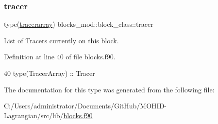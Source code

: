 \subsubsection{\texorpdfstring{tracer}{tracer}}
{\footnotesize\ttfamily type(\mbox{\hyperlink{structtracer__array__mod_1_1tracerarray}{tracerarray}}) blocks\+\_\+mod\+::block\+\_\+class\+::tracer\hspace{0.3cm}{\ttfamily [private]}}



List of Tracers currently on this block. 



Definition at line 40 of file blocks.\+f90.


\begin{DoxyCode}
40         \textcolor{keywordtype}{type}(TracerArray) :: Tracer
\end{DoxyCode}


The documentation for this type was generated from the following file\+:\begin{DoxyCompactItemize}
\item 
C\+:/\+Users/administrator/\+Documents/\+Git\+Hub/\+M\+O\+H\+I\+D-\/\+Lagrangian/src/lib/\mbox{\hyperlink{blocks_8f90}{blocks.\+f90}}\end{DoxyCompactItemize}
